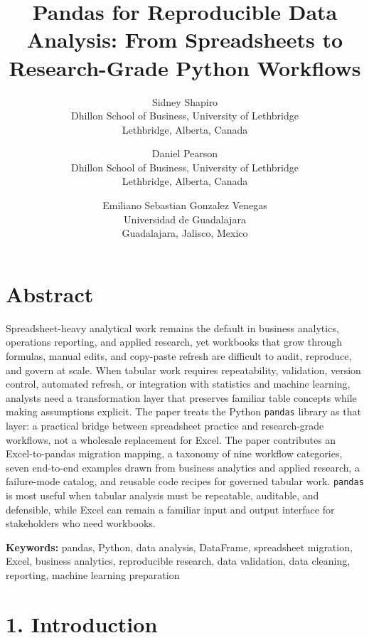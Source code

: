 \documentclass[
  12pt,
]{article}
\title{Pandas for Reproducible Data Analysis: From Spreadsheets to
Research-Grade Python Workflows}
\author{
Sidney Shapiro\\
Dhillon School of Business, University of Lethbridge\\
Lethbridge, Alberta, Canada
\and
Daniel Pearson\\
Dhillon School of Business, University of Lethbridge\\
Lethbridge, Alberta, Canada
\and
Emiliano Sebastian Gonzalez Venegas\\
Universidad de Guadalajara\\
Guadalajara, Jalisco, Mexico
}
\date{}
\begin{document}
\maketitle

\section{Abstract}\label{abstract}

Spreadsheet-heavy analytical work remains the default in business
analytics, operations reporting, and applied research, yet workbooks
that grow through formulas, manual edits, and copy-paste refresh are
difficult to audit, reproduce, and govern at scale. When tabular work
requires repeatability, validation, version control, automated refresh,
or integration with statistics and machine learning, analysts need a
transformation layer that preserves familiar table concepts while making
assumptions explicit. The paper treats the Python \texttt{pandas}
library as that layer: a practical bridge between spreadsheet practice
and research-grade workflows, not a wholesale replacement for Excel. The
paper contributes an Excel-to-pandas migration mapping, a taxonomy of
nine workflow categories, seven end-to-end examples drawn from business
analytics and applied research, a failure-mode catalog, and reusable
code recipes for governed tabular work. \texttt{pandas} is most useful
when tabular analysis must be repeatable, auditable, and defensible,
while Excel can remain a familiar input and output interface for
stakeholders who need workbooks.

\textbf{Keywords:} pandas, Python, data analysis, DataFrame, spreadsheet
migration, Excel, business analytics, reproducible research, data
validation, data cleaning, reporting, machine learning preparation

\section{1. Introduction}\label{introduction}
\end{document}
